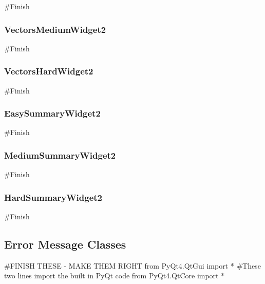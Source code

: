 \begin{landscape}
\begin{python}
#Finish
\end{python}

\subsubsection{VectorsMediumWidget2}

\begin{python}
#Finish
\end{python}

\subsubsection{VectorsHardWidget2}

\begin{python}
#Finish
\end{python}

\subsubsection{EasySummaryWidget2}

\begin{python}
#Finish
\end{python}

\subsubsection{MediumSummaryWidget2}

\begin{python}
#Finish
\end{python}

\subsubsection{HardSummaryWidget2}

\begin{python}
#Finish
\end{python}

\subsection{Error Message Classes}

\begin{python}
#FINISH THESE - MAKE THEM RIGHT
from PyQt4.QtGui import * #These two lines import the built in PyQt code
from PyQt4.QtCore import *
\end{python}


\end{landscape}
